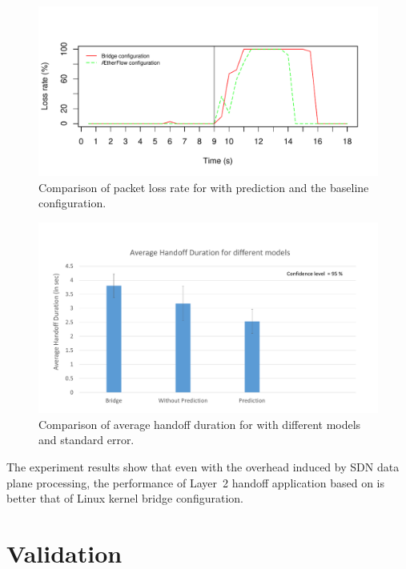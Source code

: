 \begin{figure}
\centering
\includegraphics[width=.8\textwidth]{figures/loss}
\caption{Comparison of packet loss rate for \aetherflow with prediction and the baseline configuration.} %
\label{fig:loss}
\end{figure}

\begin{figure}
\centering
\includegraphics[width=.8\textwidth]{figures/confidence}
\caption{Comparison of average handoff duration for \aetherflow with different models and standard error.}
\label{fig:confidence}
\end{figure}

The experiment results show that even with the overhead induced by SDN data plane processing, the performance of Layer~2 handoff application based
on \aetherflow is better that of Linux kernel bridge configuration. %



\section{\crossflow Validation}


